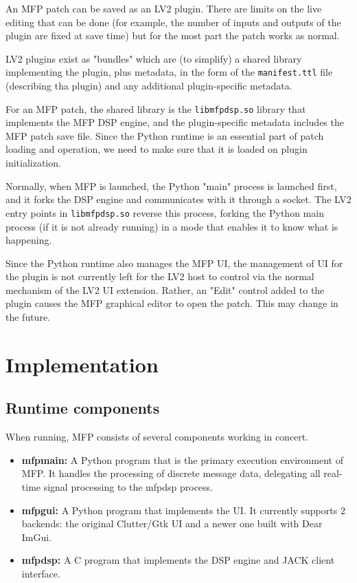 \documentclass[a4paper]{article}
\def\:{\hskip0pt}
\begin{document}
An MFP patch can be saved as an LV2 plugin. There are limits on the
live editing that can be done (for example, the number of inputs and
outputs of the plugin are fixed at save time) but for the most part
the patch works as normal.

LV2 plugins exist as "bundles" which are (to simplify) a shared
library implementing the plugin, plus metadata, in the form of
the {\tt manifest.ttl} file (describing tha plugin) and any
additional plugin\:-\:specific metadata.

For an MFP patch, the shared library is the {\tt libmfpdsp.so}
library that implements the MFP DSP engine, and the
plugin\:-\:specific metadata includes the MFP patch save file. Since
the Python runtime is an essential part of patch loading and
operation, we need to make sure that it is loaded on plugin
initialization.

Normally, when MFP is launched, the Python "main" process is
launched first, and it forks the DSP engine and communicates with
it through a socket. The LV2 entry points in {\tt libmfpdsp.so}
reverse this process, forking the Python main process (if it is
not already running) in a mode that enables it to know what is
happening.

Since the Python runtime also manages the MFP UI, the management
of UI for the plugin is not currently left for the LV2 host to
control via the normal mechanism of the LV2 UI extension. Rather,
an "Edit" control added to the plugin causes the MFP graphical editor to
open the patch. This may change in the future.


\section{Implementation}

\subsection{Runtime components}

When running, MFP consists of several components working in concert.

\begin{itemize}
\item[]
{\bf mfpmain:} A Python program that is the primary execution
environment of MFP. It handles the processing of discrete
message data, delegating all real\:-\:time signal processing to the
mfpdsp process.

\item[]
{\bf mfpgui:} A Python program that implements the UI. It currently
supports 2 backends: the original Clutter/Gtk UI and a newer one
built with Dear ImGui.

\item[]
{\bf mfpdsp:} A C program that implements the DSP engine and JACK
client interface.
\end{itemize}
\end{document}
